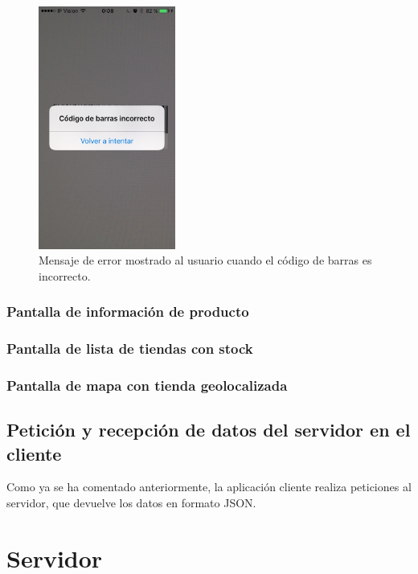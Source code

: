 \begin{figure}[h]
	\centering
		\includegraphics[width=0.4\textwidth]{./img/camara-error.jpg}
	\caption{Mensaje de error mostrado al usuario cuando el código de barras es incorrecto.}
	\label{fig:codigoBarrasError}
\end{figure}

\subsubsection{Pantalla de información de producto}

\subsubsection{Pantalla de lista de tiendas con stock}

\subsubsection{Pantalla de mapa con tienda geolocalizada}

\subsection{Petición y recepción de datos del servidor en el cliente}
Como ya se ha comentado anteriormente, la aplicación cliente realiza peticiones al servidor, que devuelve los datos en formato JSON.

\section{Servidor}

\chapterend